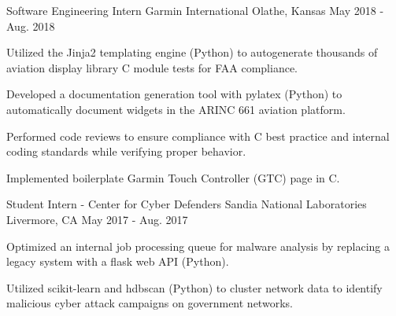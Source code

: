 

\begin{cventries}


\cventry
  {Software Engineering Intern} %
  {Garmin International} %
  {Olathe, Kansas} %
  {May 2018 - Aug. 2018} %
  {
    \begin{cvitems} %
      \item {Utilized the Jinja2 templating engine (Python) to autogenerate thousands of aviation display library C module tests for FAA compliance.}
      \item {Developed a documentation generation tool with pylatex (Python) to automatically document widgets in the ARINC 661 aviation platform.}
      \item {Performed code reviews to ensure compliance with C best practice and internal coding standards while verifying proper behavior.}
      \item {Implemented boilerplate Garmin Touch Controller (GTC) page in C.}
    \end{cvitems}
  }


\cventry
  {Student Intern - Center for Cyber Defenders} %
  {Sandia National Laboratories} %
  {Livermore, CA} %
  {May 2017 - Aug. 2017} %
  {
    \begin{cvitems} %
      \item {Optimized an internal job processing queue for malware analysis by replacing a legacy system with a flask web API (Python).}
      \item {Utilized scikit-learn and hdbscan (Python) to cluster network data to identify malicious cyber attack campaigns on government networks.}
    \end{cvitems}
  }



\end{cventries}
